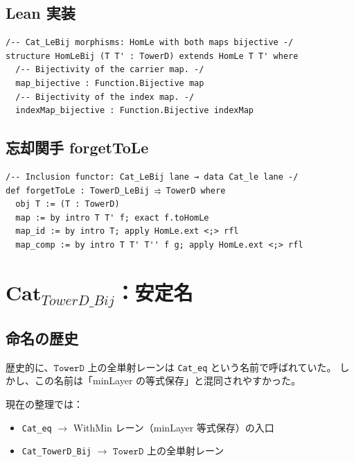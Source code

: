 \documentclass{ltjsarticle}
\theoremstyle{definition}
\newcommand{\TowerD}{\mathtt{TowerD}}
\newcommand{\HomLeBij}{\mathtt{HomLeBij}}
\begin{document}
\subsection{Lean 実装}

\begin{lstlisting}[caption=$\HomLeBij$ の Lean 定義（Cat\_LeBij.lean より）]
/-- Cat_LeBij morphisms: HomLe with both maps bijective -/
structure HomLeBij (T T' : TowerD) extends HomLe T T' where
  /-- Bijectivity of the carrier map. -/
  map_bijective : Function.Bijective map
  /-- Bijectivity of the index map. -/
  indexMap_bijective : Function.Bijective indexMap
\end{lstlisting}

\subsection{忘却関手 forgetToLe}

\begin{lstlisting}[caption=forgetToLe の実装]
/-- Inclusion functor: Cat_LeBij lane → data Cat_le lane -/
def forgetToLe : TowerD_LeBij ⥤ TowerD where
  obj T := (T : TowerD)
  map := by intro T T' f; exact f.toHomLe
  map_id := by intro T; apply HomLe.ext <;> rfl
  map_comp := by intro T T' T'' f g; apply HomLe.ext <;> rfl
\end{lstlisting}

\section{$\mathbf{Cat}_{TowerD\_Bij}$：安定名}

\subsection{命名の歴史}

歴史的に、$\TowerD$ 上の全単射レーンは \texttt{Cat\_eq} という名前で呼ばれていた。
しかし、この名前は「minLayer の等式保存」と混同されやすかった。

現在の整理では：
\begin{itemize}
  \item \texttt{Cat\_eq} $\to$ WithMin レーン（minLayer 等式保存）の入口
  \item \texttt{Cat\_TowerD\_Bij} $\to$ $\TowerD$ 上の全単射レーン
\end{itemize}
\end{document}
